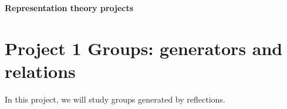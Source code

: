 \documentclass[12pt]{article}
\newcommand\zz{\mathbb{Z}}
\theoremstyle{definition}
\theoremstyle{remark}
\begin{document}
\centerline{\bf\large Representation theory projects}
\centerline{}











\section{Project 1 Groups: generators and relations}
In this project, we will study groups generated by reflections. 
\end{document}
